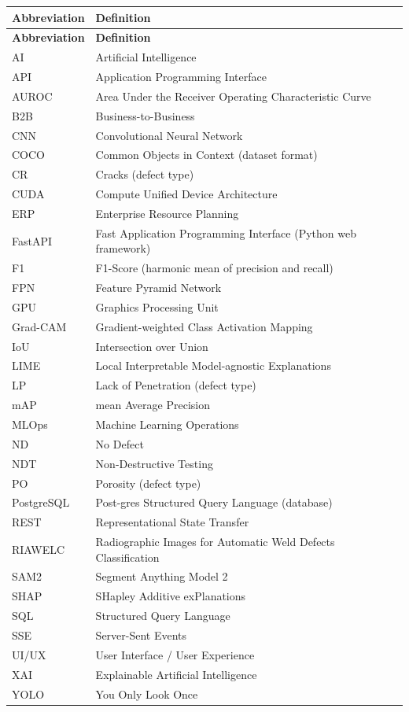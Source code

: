 \documentclass[12pt,a4paper]{report}
\begin{document}
\begin{longtable}[l]{@{}p{2.5cm}p{11.5cm}@{}}
\toprule
\textbf{Abbreviation} & \textbf{Definition} \\
\midrule
\endfirsthead

\toprule
\textbf{Abbreviation} & \textbf{Definition} \\
\midrule
\endhead

\bottomrule
\endfoot

\bottomrule
\endlastfoot


AI & Artificial Intelligence \\
API & Application Programming Interface \\
AUROC & Area Under the Receiver Operating Characteristic Curve \\
B2B & Business-to-Business \\
CNN & Convolutional Neural Network \\
COCO & Common Objects in Context (dataset format) \\
CR & Cracks (defect type) \\
CUDA & Compute Unified Device Architecture \\
ERP & Enterprise Resource Planning \\
FastAPI & Fast Application Programming Interface (Python web framework) \\
F1 & F1-Score (harmonic mean of precision and recall) \\
FPN & Feature Pyramid Network \\
GPU & Graphics Processing Unit \\
Grad-CAM & Gradient-weighted Class Activation Mapping \\
IoU & Intersection over Union \\
LIME & Local Interpretable Model-agnostic Explanations \\
LP & Lack of Penetration (defect type) \\
mAP & mean Average Precision \\
MLOps & Machine Learning Operations \\
ND & No Defect \\
NDT & Non-Destructive Testing \\
PO & Porosity (defect type) \\
PostgreSQL & Post-gres Structured Query Language (database) \\
REST & Representational State Transfer \\
RIAWELC & Radiographic Images for Automatic Weld Defects Classification \\
SAM2 & Segment Anything Model 2 \\
SHAP & SHapley Additive exPlanations \\
SQL & Structured Query Language \\
SSE & Server-Sent Events \\
UI/UX & User Interface / User Experience \\
XAI & Explainable Artificial Intelligence \\
YOLO & You Only Look Once \\
\end{longtable}
\end{document}
